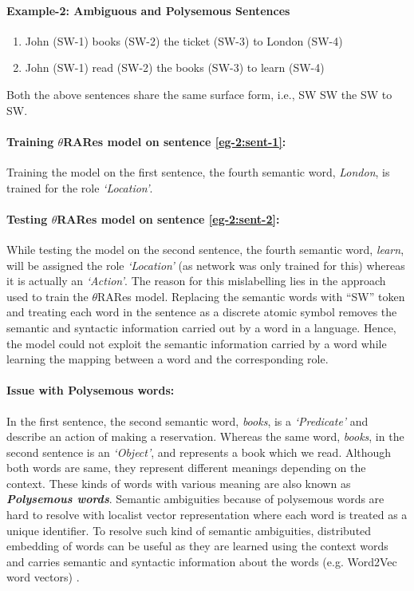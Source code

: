 \paragraph{Example-2: Ambiguous and Polysemous Sentences}

\begin{enumerate}[noitemsep]
\item John (SW-1) books (SW-2) the ticket (SW-3) to London (SW-4) \label{eg-2:sent-1}
\item John (SW-1) read (SW-2) the books (SW-3) to learn (SW-4) \label{eg-2:sent-2}
\end{enumerate}

Both the above sentences share the same surface form, i.e., SW SW the SW to SW.

\paragraph{Training $\theta$RARes model on sentence \ref{eg-2:sent-1}:} Training the model on the first sentence, the fourth semantic word, \textit{London}, is trained for the role \textit{`Location'}.

\paragraph{Testing $\theta$RARes model on sentence \ref{eg-2:sent-2}:} While testing the model on the second sentence, the fourth semantic word, \textit{learn}, will be assigned the role \textit{`Location'} (as network was only trained for this) whereas it is actually an \textit{`Action'}. The reason for this mislabelling lies in the approach used to train the $\theta$RARes model. Replacing the semantic words with ``SW'' token and treating each word in the sentence as a discrete atomic symbol removes the semantic and syntactic information carried out by a word in a language. Hence, the model could not exploit the semantic information carried by a word while learning the mapping between a word and the corresponding role.

\paragraph{Issue with Polysemous words:} In the first sentence, the second semantic word, \textit{books}, is a \textit{`Predicate'} and describe an action of making a reservation. Whereas the same word, \textit{books}, in the second sentence is an \textit{`Object'}, and represents a book which we read. Although both words are same, they represent different meanings depending on the context. These kinds of words with various meaning are also known as \textit{\textbf{Polysemous words}}. Semantic ambiguities because of polysemous words are hard to resolve with localist vector representation where each word is treated as a unique identifier. To resolve such kind of semantic ambiguities, distributed embedding of words can be useful as they are learned using the context words and carries semantic and syntactic information about the words (e.g. Word2Vec word vectors) \cite{w2v:mikolov_2013_distributed, w2v:mikolov_2013_efficient}.

